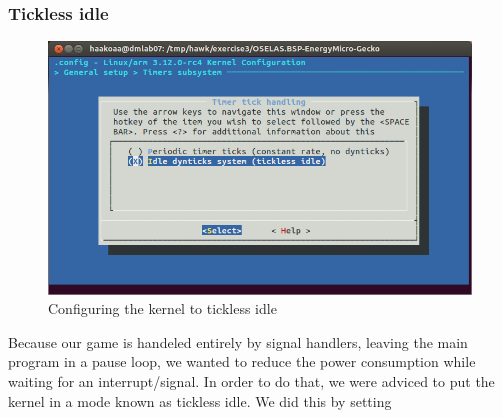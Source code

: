 \subsubsection{Tickless idle}
\begin{figure}[h]
	\centering
	\includegraphics[width=12cm]{img/tickless.png}
	\caption{Configuring the kernel to tickless idle}
	\label{fig:tickless}
\end{figure}
Because our game is handeled entirely by signal handlers, leaving the main program in a pause loop, we wanted to reduce the power consumption while waiting for an interrupt/signal. In order to do that, we were adviced to put the kernel in a mode known as tickless idle. We did this by setting

